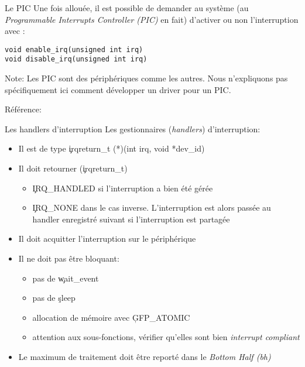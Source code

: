 \begin{frame}[fragile=singleslide]{Le PIC}
  Une  fois  allouée, il  est  possible  de  demander au  système  (au
  \emph{Programmable Interrupts  Controller (PIC)} en  fait) d'activer
  ou non l'interruption avec :
  \begin{lstlisting}
void enable_irq(unsigned int irq)
void disable_irq(unsigned int irq)
  \end{lstlisting} 

  Note:  Les  PIC  sont  des  périphériques  comme  les  autres.  Nous
  n'expliquons  pas spécifiquement  ici comment  développer  un driver
  pour un PIC.

  Référence:  
\end{frame}

\begin{frame}[fragile=singleslide]{Les handlers d'interruption}
  Les gestionnaires (\emph{handlers})  d'interruption:
  \begin{itemize} 
  \item Il est de type \c{irqreturn_t (*)(int irq, void *dev_id)}
  \item Il doit retourner (\c{irqreturn_t})
    \begin{itemize} 
    \item  \c{IRQ_HANDLED} si l'interruption a bien été gérée
    \item \c{IRQ_NONE}  dans le cas inverse.  L'interruption est alors
      passée  au  handler  enregistré  suivant si  l'interruption  est
      partagée
    \end{itemize} 
  \item Il doit acquitter l'interruption sur le périphérique
  \item Il ne doit pas être bloquant: 
    \begin{itemize} 
    \item pas de \c{wait_event}
    \item pas de \c{sleep}
    \item allocation de mémoire avec \c{GFP_ATOMIC}
    \item  attention aux sous-fonctions,  vérifier qu'elles  sont bien
      \emph{interrupt compliant}
    \end{itemize}
  \item  Le   maximum  de  traitement   doit  être  reporté   dans  le
    \emph{Bottom Half (bh)}
  \end{itemize}  
\end{frame} 


